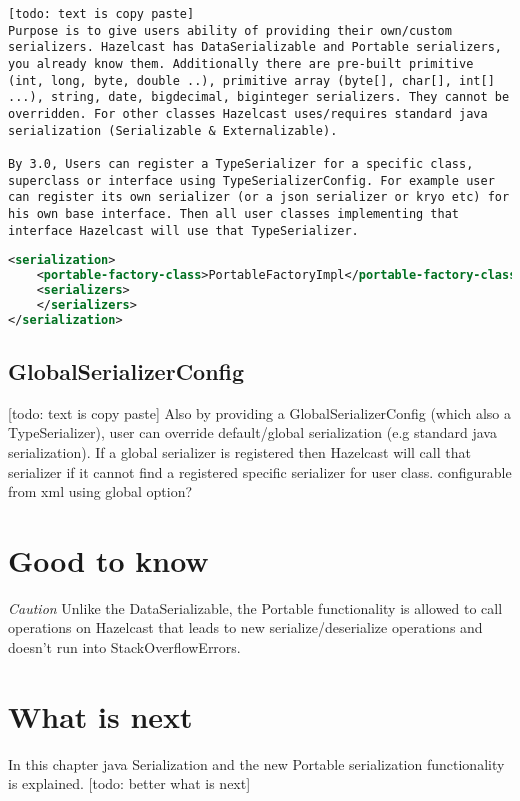 \begin{lstlisting}
[todo: text is copy paste]
Purpose is to give users ability of providing their own/custom serializers. Hazelcast has DataSerializable and Portable serializers, you already know them. Additionally there are pre-built primitive (int, long, byte, double ..), primitive array (byte[], char[], int[] ...), string, date, bigdecimal, biginteger serializers. They cannot be overridden. For other classes Hazelcast uses/requires standard java serialization (Serializable & Externalizable). 

By 3.0, Users can register a TypeSerializer for a specific class, superclass or interface using TypeSerializerConfig. For example user can register its own serializer (or a json serializer or kryo etc) for his own base interface. Then all user classes implementing that interface Hazelcast will use that TypeSerializer.
\end{lstlisting}

\begin{lstlisting}[language=xml]
<serialization>
    <portable-factory-class>PortableFactoryImpl</portable-factory-class>
    <serializers>
    </serializers>
</serialization>
\end{lstlisting}

\subsection{GlobalSerializerConfig}
[todo: text is copy paste]
Also by providing a GlobalSerializerConfig (which also a TypeSerializer), user can override default/global serialization (e.g standard java serialization). If a global serializer is registered then Hazelcast will call that serializer if it cannot find a registered specific serializer for user class. configurable from xml using global option?

\section{Good to know}

\emph{Caution}  Unlike the DataSerializable, the Portable functionality is allowed to call operations on Hazelcast that leads to new serialize/deserialize operations and doesn't run into StackOverflowErrors.

\section{What is next}
In this chapter java Serialization and the new Portable serialization functionality is explained. [todo: better what is next]